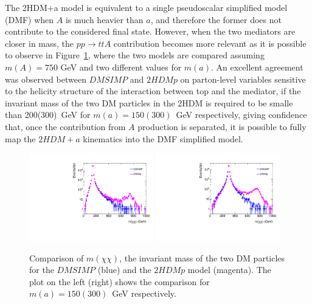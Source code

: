 The 2HDM+a model is equivalent to a single pseudoscalar simplified
model (DMF) when $A$ is much heavier than $a$, and therefore the
former does not contribute to the considered final state. However,
when the two mediators are closer in mass, the $pp\rightarrow ttA$
contribution becomes more relevant  as it is possible to observe in 
Figure~\ref{fig:mdd}, where the two models are compared
assuming $m(A) = 750$ GeV and two different values
for $m(a)$. An excellent agreement was observed between
$DMSIMP$ and $2HDMp$ on parton-level variables sensitive 
to the helicity structure of the interaction between top and the
mediator\cite{Haisch:2016gry}, if the invariant mass of the two DM
particles in the 2HDM is required to be smalle than 200(300)~GeV for
$m(a)=150(300)$~GeV respectively, giving confidence that,
once the contribution from $A$ production is separated, it is possible
to fully map the $2HDM+a$ kinematics into the DMF simplified model. 


\begin{figure}[htb]
\begin{center}
\includegraphics[width=0.48\textwidth]{texinputs/04_grid/figures/DMHF/mdd150.pdf}
\includegraphics[width=0.48\textwidth]{texinputs/04_grid/figures/DMHF/mdd300.pdf}
\caption{Comparison of $m(\chi\chi)$, the invariant mass of 
the two DM particles for the $DMSIMP$ (blue) and the $2HDMp$ model (magenta). The plot on the left (right) shows the comparison for $m(a)=150(300)$~GeV
respectively.}
\label{fig:mdd}
\end{center}
\end{figure}

